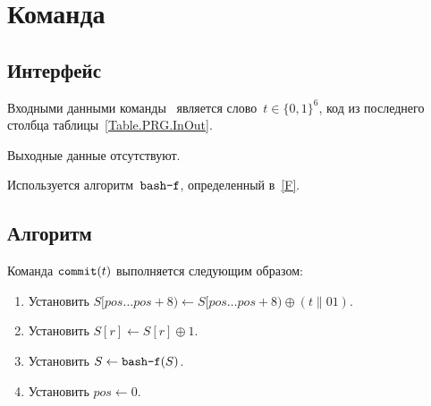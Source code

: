 \section{Команда }\label{PRG.Commit}

\subsection{Интерфейс}\label{PRG.Commit.IFace}

Входными данными команды~ является слово~$t\in\{0,1\}^6$,
код из последнего столбца таблицы~\ref{Table.PRG.InOut}.

Выходные данные отсутствуют. 

Используется алгоритм~$\texttt{bash-f}$, определенный в~\ref{F}.

\subsection{Алгоритм}\label{PRG.Commit.Alg}

Команда $\texttt{commit}(t)$ выполняется следующим образом:
\begin{enumerate}
\item
Установить
$S[pos\dots pos+8)\leftarrow S[pos\dots pos+8)\oplus (t\parallel 01)$.
\item
Установить
$S[r]\leftarrow S[r]\oplus 1$.
\item
Установить
$S\leftarrow\texttt{bash-f}(S)$.
\item
Установить
$pos\leftarrow 0$.
\end{enumerate}

